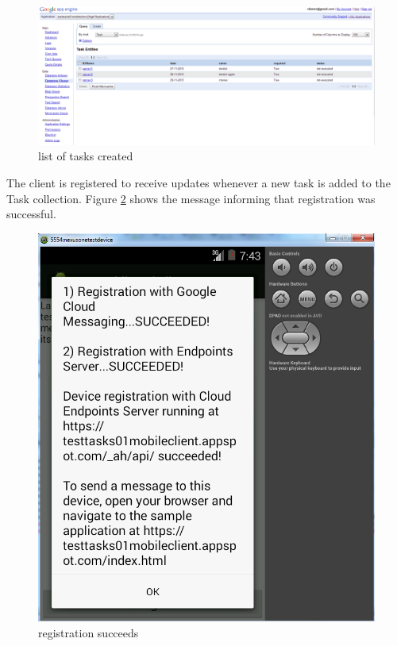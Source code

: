 \begin{figure}[ht]
	\centering
	\includegraphics[scale=0.7]{images/googlecloud__taskexist.png}
	\caption{list of tasks created}
	\label{mobile_task_list_figure}
\end{figure}

The client is registered to receive updates whenever a new task is added to the Task collection. Figure \ref{mobile_registration_figure} shows the message informing that registration was successful.\\
\begin{figure}[ht]
	\centering
	\includegraphics[scale=0.7]{images/googlemessagin_isonline_cloudmessaging.png}
	\caption{registration succeeds}
	\label{mobile_registration_figure}
\end{figure}

